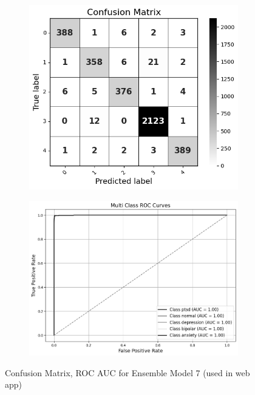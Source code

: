 \pagebreak

\begin{figure}[h!]
    \centering
    \begin{subfigure}[b]{0.48\textwidth}
        \centering
        \includegraphics[width=\textwidth]{Images/EM T CM.png}
        \label{em_t cm}  %
    \end{subfigure}
    \hfill
    \begin{subfigure}[b]{0.5\textwidth}
        \centering
        \includegraphics[width=\textwidth]{Images/EM T ROC.png}
        \label{em_t roc}  %
    \end{subfigure}
    \vspace{-0.5cm}
    \caption{Confusion Matrix, ROC AUC for Ensemble Model 7 (used in web app)}
    \label{fig:ensemble_model7_comparison}
\end{figure}

